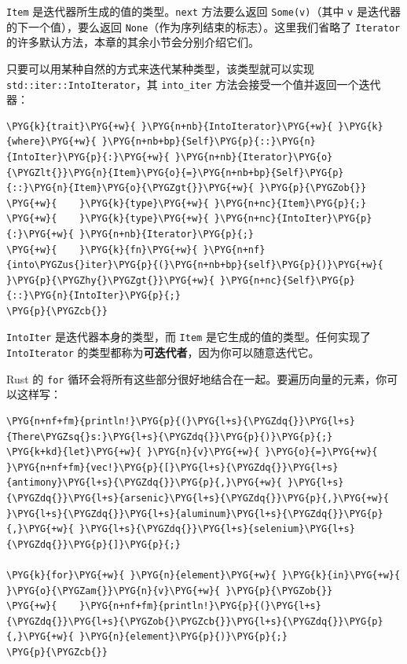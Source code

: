 \texttt{Item} 是迭代器所生成的值的类型。\texttt{next} 方法要么返回 \texttt{Some(v)}（其中 \texttt{v} 是迭代器的下一个值），要么返回 \texttt{None}（作为序列结束的标志）。这里我们省略了 \texttt{Iterator} 的许多默认方法，本章的其余小节会分别介绍它们。

只要可以用某种自然的方式来迭代某种类型，该类型就可以实现 \texttt{std::iter::IntoIterator}，其 \texttt{into\_iter} 方法会接受一个值并返回一个迭代器：

\begin{Verbatim}[commandchars=\\\{\},breaklines=true,breakanywhere=true,fontsize=\codefont,xleftmargin=17bp]
\PYG{k}{trait}\PYG{+w}{ }\PYG{n+nb}{IntoIterator}\PYG{+w}{ }\PYG{k}{where}\PYG{+w}{ }\PYG{n+nb+bp}{Self}\PYG{p}{::}\PYG{n}{IntoIter}\PYG{p}{:}\PYG{+w}{ }\PYG{n+nb}{Iterator}\PYG{o}{\PYGZlt{}}\PYG{n}{Item}\PYG{o}{=}\PYG{n+nb+bp}{Self}\PYG{p}{::}\PYG{n}{Item}\PYG{o}{\PYGZgt{}}\PYG{+w}{ }\PYG{p}{\PYGZob{}}
\PYG{+w}{    }\PYG{k}{type}\PYG{+w}{ }\PYG{n+nc}{Item}\PYG{p}{;}
\PYG{+w}{    }\PYG{k}{type}\PYG{+w}{ }\PYG{n+nc}{IntoIter}\PYG{p}{:}\PYG{+w}{ }\PYG{n+nb}{Iterator}\PYG{p}{;}
\PYG{+w}{    }\PYG{k}{fn}\PYG{+w}{ }\PYG{n+nf}{into\PYGZus{}iter}\PYG{p}{(}\PYG{n+nb+bp}{self}\PYG{p}{)}\PYG{+w}{ }\PYG{p}{\PYGZhy{}\PYGZgt{}}\PYG{+w}{ }\PYG{n+nc}{Self}\PYG{p}{::}\PYG{n}{IntoIter}\PYG{p}{;}
\PYG{p}{\PYGZcb{}}
\end{Verbatim}

\texttt{IntoIter} 是迭代器本身的类型，而 \texttt{Item} 是它生成的值的类型。任何实现了 \texttt{IntoIterator} 的类型都称为\textbf{可迭代者}，因为你可以随意迭代它。

Rust 的 \texttt{for} 循环会将所有这些部分很好地结合在一起。要遍历向量的元素，你可以这样写：

\begin{Verbatim}[commandchars=\\\{\},breaklines=true,breakanywhere=true,fontsize=\codefont,xleftmargin=17bp]
\PYG{n+nf+fm}{println!}\PYG{p}{(}\PYG{l+s}{\PYGZdq{}}\PYG{l+s}{There\PYGZsq{}s:}\PYG{l+s}{\PYGZdq{}}\PYG{p}{)}\PYG{p}{;}
\PYG{k+kd}{let}\PYG{+w}{ }\PYG{n}{v}\PYG{+w}{ }\PYG{o}{=}\PYG{+w}{ }\PYG{n+nf+fm}{vec!}\PYG{p}{[}\PYG{l+s}{\PYGZdq{}}\PYG{l+s}{antimony}\PYG{l+s}{\PYGZdq{}}\PYG{p}{,}\PYG{+w}{ }\PYG{l+s}{\PYGZdq{}}\PYG{l+s}{arsenic}\PYG{l+s}{\PYGZdq{}}\PYG{p}{,}\PYG{+w}{ }\PYG{l+s}{\PYGZdq{}}\PYG{l+s}{aluminum}\PYG{l+s}{\PYGZdq{}}\PYG{p}{,}\PYG{+w}{ }\PYG{l+s}{\PYGZdq{}}\PYG{l+s}{selenium}\PYG{l+s}{\PYGZdq{}}\PYG{p}{]}\PYG{p}{;}

\PYG{k}{for}\PYG{+w}{ }\PYG{n}{element}\PYG{+w}{ }\PYG{k}{in}\PYG{+w}{ }\PYG{o}{\PYGZam{}}\PYG{n}{v}\PYG{+w}{ }\PYG{p}{\PYGZob{}}
\PYG{+w}{    }\PYG{n+nf+fm}{println!}\PYG{p}{(}\PYG{l+s}{\PYGZdq{}}\PYG{l+s}{\PYGZob{}\PYGZcb{}}\PYG{l+s}{\PYGZdq{}}\PYG{p}{,}\PYG{+w}{ }\PYG{n}{element}\PYG{p}{)}\PYG{p}{;}
\PYG{p}{\PYGZcb{}}
\end{Verbatim}

